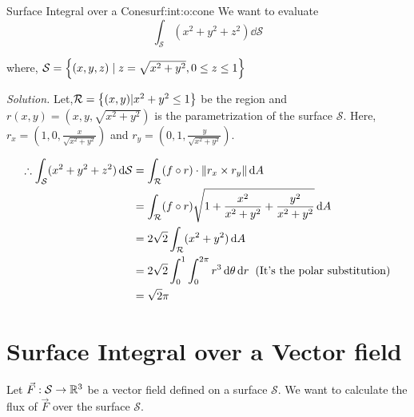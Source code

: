 \documentclass[../Analysis-3.tex]{subfiles}
\begin{document}
\begin{Eg}{Surface Integral over a Cone}{surf:int:o:cone}
  We want to evaluate \[ \int_{\mathcal{S}}(x^2+y^2+z^2) \dd \mathcal{S}\]

  where, $\mathcal{S} = \qty{(x,y,z) \mid z = \sqrt{x^2 + y^2},0 \le z \le 1}$

  \textit{Solution.} Let,$\mathcal{R} = \qty{(x,y)| x^2+y^2 \le 1}$ be the region and $r(x,y) = \left( x,y,\sqrt{x^2+y^2} \right)$ is the parametrization of the surface $\mathcal{S}$. Here, $r_x = \left( 1,0, \frac{x}{\sqrt{x^2+y^2}} \right)$ and $r_y = \left( 0,1,\frac{y}{\sqrt{x^2+y^2}} \right)$.


  \begin{align*}
    \therefore \int_{\mathcal{S}}(x^2+y^2+z^2) \, \dd \mathcal{S}
     & = \int_{\mathcal{R}} (f\circ r) \cdot \norm{r_x \times r_y} \, \dd A                                                    \\
     & = \int_{\mathcal{R}} (f\circ r) \sqrt{1 + \frac{x^2}{x^2+y^2} + \frac{y^2}{x^2+y^2}} \, \dd A                           \\
     & = 2\sqrt{2} \int_{\mathcal{R}} (x^2+y^2) \, \dd A                                                                       \\
     & = 2\sqrt{2} \int_{0}^{1} \int_{0}^{2\pi} r^3 \, \dd \theta \, \dd r \hspace{0.2cm} (\text{It's the polar substitution}) \\
     & = \sqrt{2} \pi
  \end{align*}

\end{Eg}

\section{Surface Integral over a Vector field}

Let $\vec{F} : \mathcal{S} \to \mathbb{R}^3$ be a vector field defined on a surface $\mathcal{S}$. We want to calculate the flux of $\vec{F}$ over the surface $\mathcal{S}$.
\end{document}

